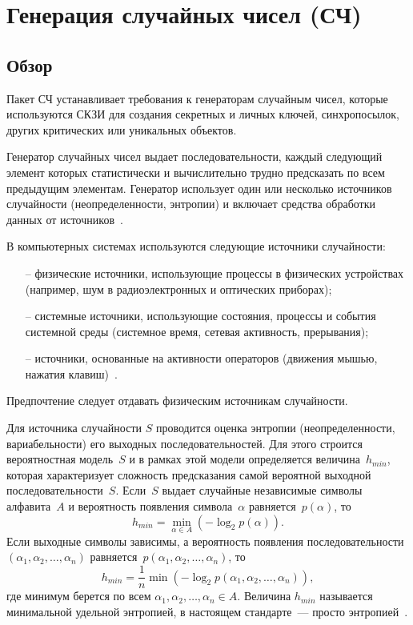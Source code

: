 \section{Генерация случайных чисел (СЧ)}\label{RN}

\subsection{Обзор}\label{RN.Intro}

Пакет СЧ устанавливает требования к генераторам случайным чисел, которые
используются СКЗИ для создания секретных и личных ключей, синхропосылок, других
критических или уникальных объектов.

Генератор случайных чисел выдает последовательности, каждый следующий элемент
которых статистически и вычислительно трудно предсказать по всем предыдущим
элементам.
%
Генератор использует один или несколько источников случайности
(неопределенности, энтропии) и включает средства обработки данных от 
источников~.

В компьютерных системах используются следующие источники случайности: 
\begin{itemize}
\item[--]
физические источники, использующие процессы в физических устройствах (например,
шум в радиоэлектронных и оптических приборах);

\item[--]
системные источники, использующие состояния, процессы и события системной среды
(системное время, сетевая активность, прерывания);

\item[--]
источники, основанные на активности операторов (движения мышью, нажатия 
клавиш)~.
\end{itemize}

Предпочтение следует отдавать физическим источникам случайности.

Для источника случайности $S$ проводится оценка энтропии (неопределенности,
вариабельности) его выходных последовательностей. Для этого строится
вероятностная модель~$S$ и в рамках этой модели определяется величина~$h_{min}$,
которая характеризует сложность предсказания самой вероятной выходной 
последовательности~$S$.  
%
Если~$S$ выдает случайные независимые символы алфавита~$A$ и
вероятность появления символа~$\alpha$ равняется~$p(\alpha)$, то
\begin{equation}\label{Eq.RN.1}\tag{1}
h_{min}=\min_{\alpha\in A}(-\log_2 p(\alpha)).
\end{equation}
Если выходные символы зависимы, а вероятность появления 
последовательности $(\alpha_1,\alpha_2,\ldots,\alpha_n)$ 
равняется~$p(\alpha_1,\alpha_2,\ldots,\alpha_n)$, 
то
\begin{equation}\label{Eq.RN.2}\tag{2}
h_{min}=\frac{1}{n}\min(-\log_2 
p(\alpha_1,\alpha_2,\ldots,\alpha_n)),
\end{equation}
где минимум берется по всем $\alpha_1,\alpha_2,\ldots,\alpha_n\in A$.
%
Величина $h_{min}$ называется минимальной удельной энтропией,
в настоящем стандарте~--- просто энтропией~.


